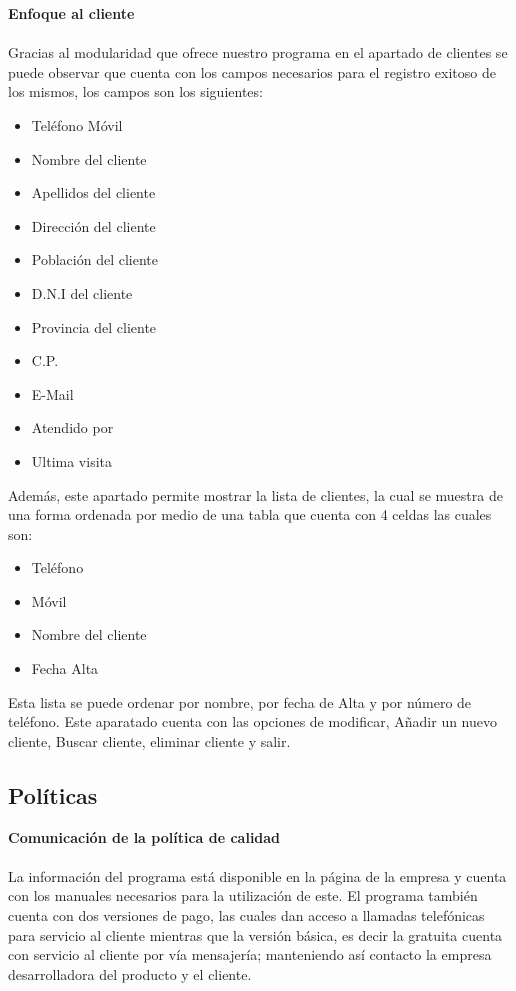 \documentclass[12pt,a4paper]{article}
\begin{document}
\textbf {Enfoque al cliente}\\\\
Gracias al modularidad que ofrece nuestro programa en el apartado de clientes se puede observar que cuenta con los campos necesarios para el registro exitoso de los mismos, los campos son los siguientes: 
\begin{itemize}
\item Teléfono Móvil 
\item Nombre del cliente
\item Apellidos del cliente
\item Dirección del cliente 
\item Población del cliente
\item D.N.I del cliente 
\item Provincia del cliente 
\item C.P.
\item E-Mail
\item Atendido por 
\item Ultima visita 
\end{itemize}

Además, este apartado permite mostrar la lista de clientes, la cual se muestra de una forma ordenada por medio de una tabla que cuenta con 4 celdas las cuales son:
\begin{itemize}
\item Teléfono 
\item Móvil
\item Nombre del cliente
\item Fecha Alta 
\end{itemize}

Esta lista se puede ordenar por nombre, por fecha de Alta y por número de teléfono.
Este aparatado cuenta con las opciones de modificar, Añadir un nuevo cliente, Buscar cliente, eliminar cliente y salir.

\subsection{Políticas}
\textbf{Comunicación de la política de calidad}\\\\
La información del programa está disponible en la página de la empresa y cuenta con los manuales necesarios para la utilización de este.
El programa también cuenta con dos versiones de pago, las cuales dan acceso a llamadas telefónicas para servicio al cliente mientras que la versión básica, es decir la gratuita cuenta con servicio al cliente por vía mensajería; manteniendo así contacto la empresa desarrolladora del producto y el cliente.
\end{document}
